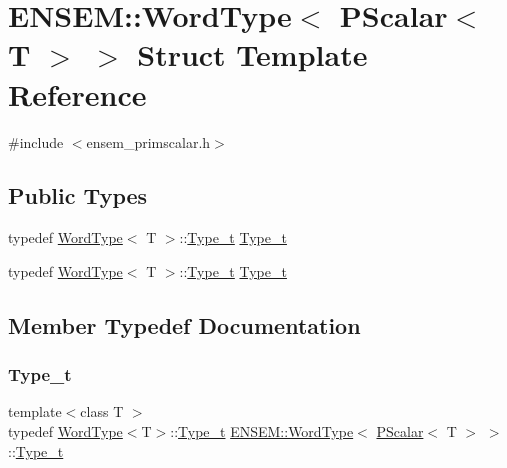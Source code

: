 \hypertarget{structENSEM_1_1WordType_3_01PScalar_3_01T_01_4_01_4}{}\section{E\+N\+S\+EM\+:\+:Word\+Type$<$ P\+Scalar$<$ T $>$ $>$ Struct Template Reference}
\label{structENSEM_1_1WordType_3_01PScalar_3_01T_01_4_01_4}


{\ttfamily \#include $<$ensem\+\_\+primscalar.\+h$>$}

\subsection*{Public Types}
\begin{DoxyCompactItemize}
\item 
typedef \mbox{\hyperlink{structENSEM_1_1WordType}{Word\+Type}}$<$ T $>$\+::\mbox{\hyperlink{structENSEM_1_1WordType_3_01PScalar_3_01T_01_4_01_4_a18e643a2710c1d27fed12cd1c6b2bfaf}{Type\+\_\+t}} \mbox{\hyperlink{structENSEM_1_1WordType_3_01PScalar_3_01T_01_4_01_4_a18e643a2710c1d27fed12cd1c6b2bfaf}{Type\+\_\+t}}
\item 
typedef \mbox{\hyperlink{structENSEM_1_1WordType}{Word\+Type}}$<$ T $>$\+::\mbox{\hyperlink{structENSEM_1_1WordType_3_01PScalar_3_01T_01_4_01_4_a18e643a2710c1d27fed12cd1c6b2bfaf}{Type\+\_\+t}} \mbox{\hyperlink{structENSEM_1_1WordType_3_01PScalar_3_01T_01_4_01_4_a18e643a2710c1d27fed12cd1c6b2bfaf}{Type\+\_\+t}}
\end{DoxyCompactItemize}


\subsection{Member Typedef Documentation}
\mbox{\label{structENSEM_1_1WordType_3_01PScalar_3_01T_01_4_01_4_a18e643a2710c1d27fed12cd1c6b2bfaf}} 
\subsubsection{\texorpdfstring{Type\_t}{Type\_t}\hspace{0.1cm}{\footnotesize\ttfamily [1/2]}}
{\footnotesize\ttfamily template$<$class T $>$ \\
typedef \mbox{\hyperlink{structENSEM_1_1WordType}{Word\+Type}}$<$T$>$\+::\mbox{\hyperlink{structENSEM_1_1WordType_3_01PScalar_3_01T_01_4_01_4_a18e643a2710c1d27fed12cd1c6b2bfaf}{Type\+\_\+t}} \mbox{\hyperlink{structENSEM_1_1WordType}{E\+N\+S\+E\+M\+::\+Word\+Type}}$<$ \mbox{\hyperlink{classENSEM_1_1PScalar}{P\+Scalar}}$<$ T $>$ $>$\+::\mbox{\hyperlink{structENSEM_1_1WordType_3_01PScalar_3_01T_01_4_01_4_a18e643a2710c1d27fed12cd1c6b2bfaf}{Type\+\_\+t}}}

